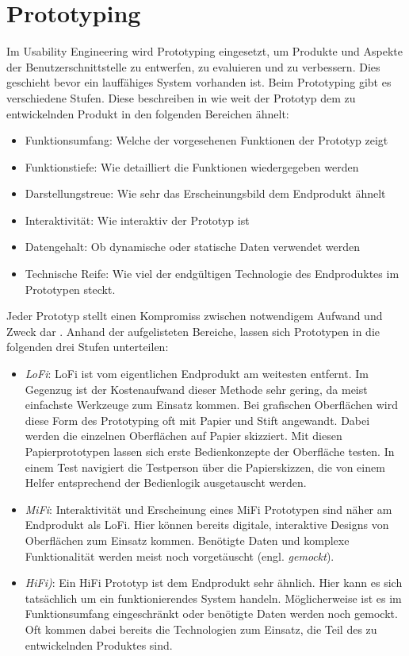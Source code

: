 \section{Prototyping}
\label{sec:prototyping}
Im Usability Engineering wird Prototyping eingesetzt, um Produkte und Aspekte der Benutzerschnittstelle zu entwerfen, zu evaluieren und zu verbessern. Dies geschieht bevor ein lauffähiges System vorhanden ist. Beim Prototyping gibt es verschiedene Stufen. Diese beschreiben in wie weit der Prototyp dem zu entwickelnden Produkt in den folgenden Bereichen ähnelt:
\begin{itemize}
\item Funktionsumfang: Welche der vorgesehenen Funktionen der Prototyp zeigt
\item Funktionstiefe: Wie detailliert die Funktionen wiedergegeben werden
\item Darstellungstreue: Wie sehr das Erscheinungsbild dem Endprodukt ähnelt
\item Interaktivität: Wie interaktiv der Prototyp ist
\item Datengehalt: Ob dynamische oder statische Daten verwendet werden
\item Technische Reife: Wie viel der endgültigen Technologie des Endproduktes im Prototypen steckt.
\end{itemize}

Jeder Prototyp stellt einen Kompromiss zwischen notwendigem Aufwand und Zweck dar \cite{richter-ux-compact}. Anhand der aufgelisteten Bereiche, lassen sich Prototypen in die folgenden drei Stufen unterteilen:

\begin{itemize}
    \item\textit{\ac{LoFi}}: \ac{LoFi} ist vom eigentlichen Endprodukt am weitesten entfernt. Im Gegenzug ist der Kostenaufwand dieser Methode sehr gering, da meist einfachste Werkzeuge zum Einsatz kommen. Bei grafischen Oberflächen wird diese Form des Prototyping oft mit Papier und Stift angewandt. Dabei werden die einzelnen Oberflächen auf Papier skizziert. Mit diesen Papierprototypen lassen sich \zB erste Bedienkonzepte der Oberfläche testen. In einem Test navigiert die Testperson über die Papierskizzen, die von einem Helfer entsprechend der Bedienlogik ausgetauscht werden.
    
    \item\textit{\ac{MiFi}}: Interaktivität und Erscheinung eines \ac{MiFi} Prototypen sind näher am Endprodukt als \ac{LoFi}. Hier können bereits digitale, interaktive Designs von Oberflächen zum Einsatz kommen. Benötigte Daten und komplexe Funktionalität werden meist noch vorgetäuscht (engl. \textit{gemockt}).
    
    \item\textit{\ac{HiFi})}: Ein \ac{HiFi} Prototyp ist dem Endprodukt sehr ähnlich. Hier kann es sich tatsächlich um ein funktionierendes System handeln. Möglicherweise ist es im Funktionsumfang eingeschränkt oder benötigte Daten werden noch gemockt. Oft kommen dabei bereits die Technologien zum Einsatz, die Teil des zu entwickelnden Produktes sind.
\end{itemize}

